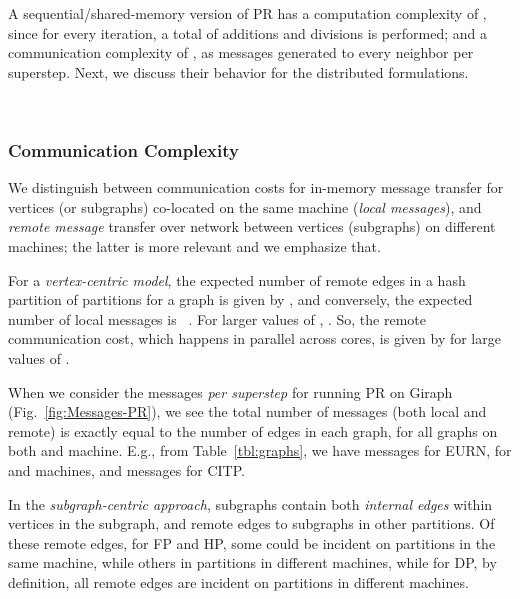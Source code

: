 \documentclass[10pt,conference, compsocconf]{IEEEtran}
\begin{document}
A sequential/shared-memory version of PR has a computation complexity of , since for every iteration, a total of  additions and  divisions is performed; and a communication complexity of , as messages generated to every neighbor per superstep. Next, we discuss their behavior for the distributed formulations.


\begin{figure*}[t!]
\centering {}~~~~
\caption{Number of messages exchanged between components \emph{per superstep} during the PR.}
\label{fig:Messages-PR}
\vspace{-0.1in}
\end{figure*}

\subsubsection{Communication Complexity}
We distinguish between communication costs for in-memory message transfer for vertices (or subgraphs) co-located on the same machine (\emph{local messages}), and \emph{remote message} transfer over network between vertices (subgraphs) on different machines; the latter is more relevant and we emphasize that. 

For a \emph{vertex-centric model}, the expected number of remote edges in a hash partition of  partitions for a graph  is given by , and conversely, the expected number of local messages is ~\cite{powergraph}. For larger values of , . So, the remote communication cost, which happens in parallel across  cores, is given by  for large values of .

When we consider the messages \emph{per superstep} for running PR on Giraph (Fig.~\ref{fig:Messages-PR}), we see the total number of messages (both local and remote) is exactly equal to the number of edges in each graph, for all  graphs on both  and  machine. E.g., from Table~\ref{tbl:graphs}, we have  messages for EURN, for  and  machines, and  messages for CITP.

In the \emph{subgraph-centric approach}, subgraphs contain both \emph{internal edges} within vertices in the subgraph, and remote edges to subgraphs in other partitions. Of these remote edges, for FP and HP, some could be incident on partitions in the same machine, while others in partitions in different machines, while for DP, by definition, all remote edges are incident on partitions in different machines.
\end{document}
